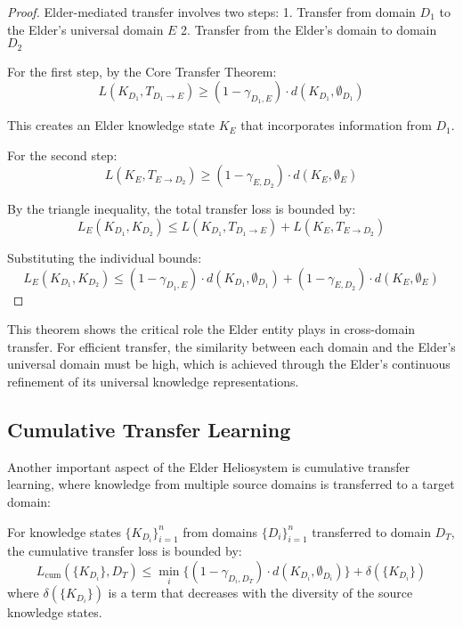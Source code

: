 \begin{proof}
Elder-mediated transfer involves two steps:
1. Transfer from domain $D_1$ to the Elder's universal domain $E$
2. Transfer from the Elder's domain to domain $D_2$

For the first step, by the Core Transfer Theorem:
\begin{equation}
L(K_{D_1}, T_{D_1 \to E}) \geq (1 - \gamma_{D_1,E}) \cdot d(K_{D_1}, \emptyset_{D_1})
\end{equation}

This creates an Elder knowledge state $K_E$ that incorporates information from $D_1$.

For the second step:
\begin{equation}
L(K_E, T_{E \to D_2}) \geq (1 - \gamma_{E,D_2}) \cdot d(K_E, \emptyset_E)
\end{equation}

By the triangle inequality, the total transfer loss is bounded by:
\begin{equation}
L_E(K_{D_1}, K_{D_2}) \leq L(K_{D_1}, T_{D_1 \to E}) + L(K_E, T_{E \to D_2})
\end{equation}

Substituting the individual bounds:
\begin{equation}
L_E(K_{D_1}, K_{D_2}) \leq (1 - \gamma_{D_1,E}) \cdot d(K_{D_1}, \emptyset_{D_1}) + (1 - \gamma_{E,D_2}) \cdot d(K_E, \emptyset_E)
\end{equation}
\end{proof}

This theorem shows the critical role the Elder entity plays in cross-domain transfer. For efficient transfer, the similarity between each domain and the Elder's universal domain must be high, which is achieved through the Elder's continuous refinement of its universal knowledge representations.

\subsection{Cumulative Transfer Learning}

Another important aspect of the Elder Heliosystem is cumulative transfer learning, where knowledge from multiple source domains is transferred to a target domain:

\begin{theorem}
For knowledge states $\{K_{D_i}\}_{i=1}^n$ from domains $\{D_i\}_{i=1}^n$ transferred to domain $D_T$, the cumulative transfer loss is bounded by:
\begin{equation}
L_{\text{cum}}(\{K_{D_i}\}, D_T) \leq \min_{i} \{(1 - \gamma_{D_i,D_T}) \cdot d(K_{D_i}, \emptyset_{D_i})\} + \delta(\{K_{D_i}\})
\end{equation}
where $\delta(\{K_{D_i}\})$ is a term that decreases with the diversity of the source knowledge states.
\end{theorem}

